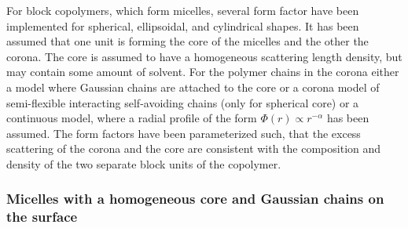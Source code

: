 For block copolymers, which form micelles, several form factor have
been implemented \cite{PedersenGerstenberg96,PedersenJApplCryst2000,SvaneborgPedersen2002}
for spherical, ellipsoidal, and cylindrical shapes.
It has been assumed that one unit is forming the core of the
micelles and the other the corona. The core is assumed to have a
homogeneous scattering length density, but may contain some amount
of solvent. For the polymer chains in the corona either a model
where Gaussian chains are attached to the core or a corona model of
semi-flexible interacting self-avoiding chains (only for spherical
core) or a continuous model, where a radial profile of the form
$\Phi(r)\varpropto r^{-\alpha}$ has been assumed. The form factors
have been parameterized such, that the excess scattering of the
corona and the core are consistent with the composition and density
of the two separate block units of the copolymer.

\vspace{3mm}
\subsubsection{Micelles with a homogeneous core and Gaussian chains on the surface}~\\
\label{Chains(RW)}

